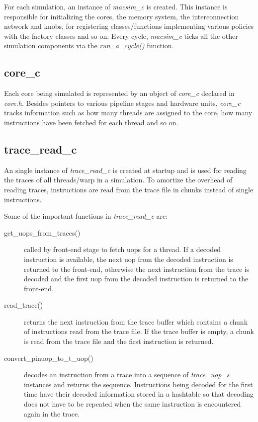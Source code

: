 For each simulation, an instance of \textit{macsim\_c} is created. This
instance is responsible for initializing the cores, the memory system, the
interconnection network and knobs, for registering classes/functions
implementing various policies with the factory classes and so on. Every cycle,
\textit{macsim\_c} ticks all the other simulation components via
the \textit{run\_a\_cycle()} function.

\subsection{core\_c}

Each core being simulated is represented by an object of \textit{core\_c}
declared in \textit{core.h}. Besides pointers to various pipeline stages and
hardware units, \textit{core\_c} tracks information such as how many threads
are assigned to the core, how many instructions have been fetched for each
thread and so on.

\subsection{trace\_read\_c}

An single instance of \textit{trace\_read\_c} is created at startup and is used
for reading the traces of all threads/warp in a simulation. To amortize the
overhead of reading traces, instructions are read from the trace file in chunks
instead of single instructions.

Some of the important functions in \textit{trace\_read\_c} are:

\begin{description}

  \item [get\_uops\_from\_traces()] called by front-end stage to fetch uops for a
	thread. If a decoded instruction is available, the next uop from the decoded
	instruction is returned to the front-end, otherwise the next instruction from
	the trace is decoded and the first uop from the decoded instruction is returned
	to the front-end.

  \item [read\_trace()] returns the next instruction from the trace buffer which
	contains a chunk of instructions read from the trace file. If the trace buffer
	is empty, a chunk is read from the trace file and the first instruction is
	returned.

  \item [convert\_pinuop\_to\_t\_uop()] decodes an instruction from a trace into a
	sequence of \textit{trace\_uop\_s} instances and returns the sequence.
	Instructions being decoded for the first time have their decoded information
	stored in a hashtable so that decoding does not have to be repeated when the
	same instruction is encountered again in the trace.

\end{description}

